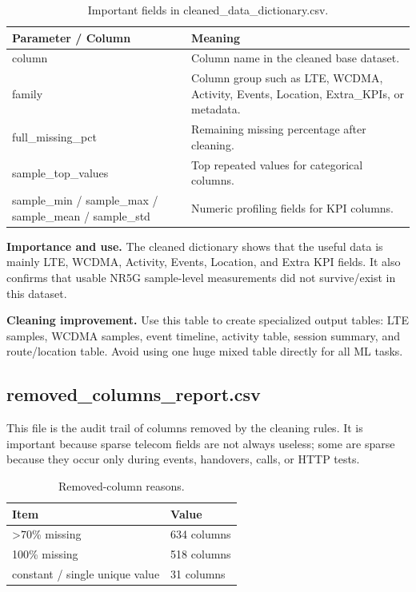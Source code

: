 \documentclass[12pt,a4paper]{article}
\begin{document}
\begin{table}[H]
\centering
\begin{tabularx}{\textwidth}{P{0.38\textwidth}Y}
\toprule
\textbf{Parameter / Column} & \textbf{Meaning} \\
\midrule
{\ttfamily column} & Column name in the cleaned base dataset. \\
{\ttfamily family} & Column group such as LTE, WCDMA, Activity, Events, Location, Extra\_KPIs, or metadata. \\
{\ttfamily full\_\allowbreak{}missing\_\allowbreak{}pct} & Remaining missing percentage after cleaning. \\
{\ttfamily sample\_\allowbreak{}top\_\allowbreak{}values} & Top repeated values for categorical columns. \\
{\ttfamily sample\_\allowbreak{}min /\allowbreak{} sample\_\allowbreak{}max /\allowbreak{} sample\_\allowbreak{}mean /\allowbreak{} sample\_\allowbreak{}std} & Numeric profiling fields for KPI columns. \\
\bottomrule
\end{tabularx}
\caption{Important fields in cleaned\_data\_dictionary.csv.}
\end{table}


\textbf{Importance and use.} The cleaned dictionary shows that the useful data is mainly LTE, WCDMA, Activity, Events, Location, and Extra KPI fields. It also confirms that usable NR5G sample-level measurements did not survive/exist in this dataset.

\textbf{Cleaning improvement.} Use this table to create specialized output tables: LTE samples, WCDMA samples, event timeline, activity table, session summary, and route/location table. Avoid using one huge mixed table directly for all ML tasks.


\subsection{removed\_columns\_report.csv}
This file is the audit trail of columns removed by the cleaning rules. It is important because sparse telecom fields are not always useless; some are sparse because they occur only during events, handovers, calls, or HTTP tests.


\begin{table}[H]
\centering
\begin{tabularx}{0.94\textwidth}{P{5.2cm}Y}
\toprule
\textbf{Item} & \textbf{Value} \\
\midrule
>70\% missing & 634 columns \\
100\% missing & 518 columns \\
constant / single unique value & 31 columns \\
\bottomrule
\end{tabularx}
\caption{Removed-column reasons.}
\end{table}
\end{document}
